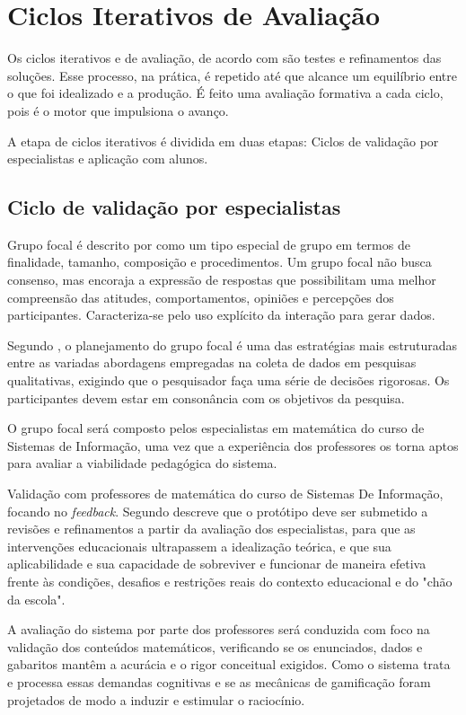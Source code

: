 \documentclass{abnt}
\begin{document}
\section{Ciclos Iterativos de Avaliação}
Os ciclos iterativos e de avaliação, de acordo com \cite{obrien2018practical}
são testes e refinamentos das soluções. Esse processo, na prática, é repetido
até que alcance um equilíbrio entre o que foi idealizado e a produção. É feito
uma avaliação formativa a cada ciclo, pois é o motor que impulsiona o avanço.

A etapa de ciclos iterativos é dividida em duas etapas: Ciclos de validação por
especialistas e aplicação com alunos.
\subsection{Ciclo de validação por especialistas}

Grupo focal é descrito por \cite{gil2021pesquisa} como um tipo especial de grupo
em termos de finalidade, tamanho, composição e procedimentos. Um grupo focal não
busca consenso, mas encoraja a expressão de respostas que possibilitam uma
melhor compreensão das atitudes, comportamentos, opiniões e percepções dos
participantes. Caracteriza-se pelo uso explícito da interação para gerar dados.

Segundo \cite{gil2021pesquisa}, o planejamento do grupo focal é uma das
estratégias mais estruturadas entre as variadas abordagens empregadas na coleta
de dados em pesquisas qualitativas, exigindo que o pesquisador faça uma série de
decisões rigorosas. Os participantes devem estar em consonância com os objetivos
da pesquisa.

O grupo focal será composto pelos especialistas em matemática do curso de
Sistemas de Informação, uma vez que a experiência dos professores os torna aptos
para avaliar a viabilidade pedagógica do sistema.

Validação com professores de matemática do curso de Sistemas De Informação,
focando no \textit{feedback}. Segundo \cite{plomp2018pesquisa} descreve que o
protótipo deve ser submetido a revisões e refinamentos a partir da avaliação dos
especialistas, para que as intervenções educacionais ultrapassem a idealização
teórica, e que sua aplicabilidade e sua capacidade de sobreviver e funcionar de
maneira efetiva frente às condições, desafios e restrições reais do contexto
educacional e do "chão da escola".

A avaliação do sistema por parte dos professores será conduzida com foco na
validação dos conteúdos matemáticos, verificando se os enunciados, dados e
gabaritos mantêm a acurácia e o rigor conceitual exigidos. Como o sistema trata
e processa essas demandas cognitivas e se as mecânicas de gamificação foram
projetados de modo a induzir e estimular o raciocínio. 
\end{document}
